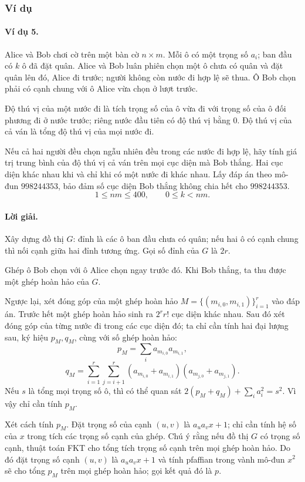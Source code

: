 \documentclass[11pt]{article}
\begin{document}
\subsubsection{Ví dụ}

\paragraph{Ví dụ 5.}
Alice và Bob chơi cờ trên một bàn cờ $n\times m$. Mỗi ô có một trọng số $a_i$;
ban đầu có $k$ ô đã đặt quân. Alice và Bob luân phiên chọn một ô chưa có quân
và đặt quân lên đó, Alice đi trước; người không còn nước đi hợp lệ sẽ thua. Ô
Bob chọn phải có cạnh chung với ô Alice vừa chọn ở lượt trước.

Độ thú vị của một nước đi là tích trọng số của ô vừa đi với trọng số của ô đối
phương đi ở nước trước; riêng nước đầu tiên có độ thú vị bằng $0$. Độ thú vị
của cả ván là tổng độ thú vị của mọi nước đi.

Nếu cả hai người đều chọn ngẫu nhiên đều trong các nước đi hợp lệ, hãy tính giá
trị trung bình của độ thú vị cả ván trên mọi cục diện mà Bob thắng. Hai cục diện
khác nhau khi và chỉ khi có một nước đi khác nhau. Lấy đáp án theo mô-đun
$998244353$, bảo đảm số cục diện Bob thắng không chia hết cho $998244353$.
\[
  1\le nm\le 400,\qquad 0\le k<nm.
\]

\paragraph{Lời giải.}
Xây dựng đồ thị $G$: đỉnh là các ô ban đầu chưa có quân; nếu hai ô có cạnh
chung thì nối cạnh giữa hai đỉnh tương ứng. Gọi số đỉnh của $G$ là $2r$.

Ghép ô Bob chọn với ô Alice chọn ngay trước đó. Khi Bob thắng, ta thu được một
ghép hoàn hảo của $G$.

Ngược lại, xét đóng góp của một ghép hoàn hảo
$M=\{(m_{i,0},m_{i,1})\}_{i=1}^r$ vào đáp án. Trước hết một ghép hoàn hảo sinh
ra $2^r r!$ cục diện khác nhau. Sau đó xét đóng góp của từng nước đi trong các
cục diện đó; ta chỉ cần tính hai đại lượng sau, ký hiệu $p_M,q_M$, cùng với số
ghép hoàn hảo:
\[
  p_M=\sum_i a_{m_{i,0}}a_{m_{i,1}},
\]
\[
  q_M=\sum_{i=1}^r\sum_{j=i+1}^r
  (a_{m_{i,0}}+a_{m_{i,1}})(a_{m_{j,0}}+a_{m_{j,1}}).
\]
Nếu $s$ là tổng mọi trọng số ô, thì có thể quan sát
$2(p_M+q_M)+\sum_i a_i^2=s^2$. Vì vậy chỉ cần tính $p_M$.

Xét cách tính $p_M$. Đặt trọng số của cạnh $(u,v)$ là $a_u a_v x+1$; chỉ cần
tính hệ số của $x$ trong tích các trọng số cạnh của ghép. Chú ý rằng nếu đồ thị
$G$ có trọng số cạnh, thuật toán FKT cho tổng tích trọng số cạnh trên mọi ghép
hoàn hảo. Do đó đặt trọng số cạnh $(u,v)$ là $a_u a_vx+1$ và tính pfaffian
trong vành mô-đun $x^2$ sẽ cho tổng $p_M$ trên mọi ghép hoàn hảo; gọi kết quả
đó là $p$.
\end{document}
